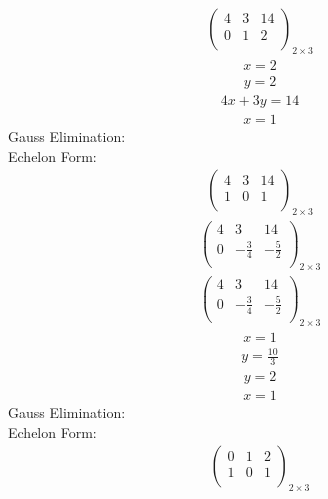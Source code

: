 \documentclass{article}
\begin{document}
\begin{align*}
\left(
\begin{array}{cc|c}
4 & 3 & 14\\
0 & 1 & 2\\
\end{array}
\right)_{2\times 3}
\end{align*}
\begin{align*}
x=2\end{align*}
\begin{align*}
y=2\end{align*}
\begin{align*}
4x + 3y=14\end{align*}
\begin{align*}
x=1\end{align*}
Gauss Elimination:\\
Echelon Form:\\
\begin{align*}
\left(
\begin{array}{cc|c}
4 & 3 & 14\\
1 & 0 & 1\\
\end{array}
\right)_{2\times 3}
\end{align*}
\begin{align*}
\left(
\begin{array}{cc|c}
4 & 3 & 14\\
0 & -\frac{3}{4} & -\frac{5}{2}\\
\end{array}
\right)_{2\times 3}
\end{align*}
\begin{align*}
\left(
\begin{array}{cc|c}
4 & 3 & 14\\
0 & -\frac{3}{4} & -\frac{5}{2}\\
\end{array}
\right)_{2\times 3}
\end{align*}
\begin{align*}
x=1\end{align*}
\begin{align*}
y=\frac{10}{3}\end{align*}
\begin{align*}
y=2\end{align*}
\begin{align*}
x=1\end{align*}
Gauss Elimination:\\
Echelon Form:\\
\begin{align*}
\left(
\begin{array}{cc|c}
0 & 1 & 2\\
1 & 0 & 1\\
\end{array}
\right)_{2\times 3}
\end{align*}
\end{document}
